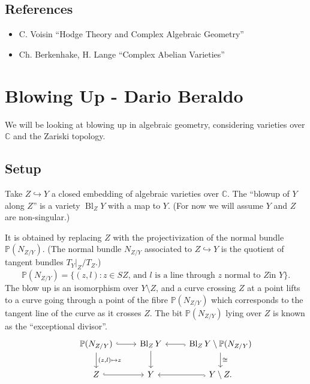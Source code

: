 \documentclass{article}
\theoremstyle{definition}
\DeclareMathOperator{\Bl}{Bl}
\renewcommand{\P}{\mathbb{P}}
\newcommand{\C}{\mathbb{C}}
\begin{document}
\subsection*{References}

\begin{itemize}
    \item C. Voisin ``Hodge Theory and Complex Algebraic Geometry''
    \item Ch. Berkenhake, H. Lange ``Complex Abelian Varieties''
\end{itemize}

\section{Blowing Up - Dario Beraldo}

We will be looking at blowing up in algebraic geometry, considering
varieties over $\C$ and the Zariski topology.

\subsection*{Setup}

Take $Z\hookrightarrow Y$ a closed embedding of algebraic varieties over $\C$.
The ``blowup of $Y$ along $Z$'' is a variety $\Bl_ZY$ with a map to $Y$. (For
now we will assume $Y$ and $Z$ are non-singular.)

It is obtained by replacing $Z$ with the projectivization of the normal bundle
$\P(N_{Z/Y})$. (The normal bundle $N_{Z/Y}$ associated to $Z\hookrightarrow Y$
is the quotient of tangent bundles $T_Y|_Z/T_Z$.)
\begin{equation*}
    \P(N_{Z/Y})
        = \{(z,l):\text{$z\in SZ$, and $l$ is a line through $z$ normal to $Z$
            in $Y$}\}.
\end{equation*}
The blow up is an isomorphism over $Y\setminus Z$, and a curve crossing $Z$ at a
point lifts to a curve going through a point of the fibre $\P(N_{Z/Y})$ which
corresponds to the tangent line of the curve as it crosses $Z$. The bit
$\P(N_{Z/Y})$ lying over $Z$ is known as the ``exceptional divisor''.
\begin{equation*}
    \begin{tikzcd}
        &\P(N_{Z/Y}) \ar[r,hook] \ar[d,"{(z,l)\mapsto z}"]
        &\Bl_ZY \ar[d]
        &\Bl_ZY\setminus\P(N_{Z/Y}) \ar[l,hook] \ar[d,"\cong"] \\
        &Z \ar[r,hook] &Y &Y\setminus Z \ar[l,hook].
    \end{tikzcd}
\end{equation*}
\end{document}
